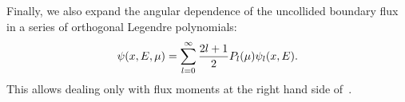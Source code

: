 Finally, we also expand the angular dependence of the uncollided boundary flux in a series of orthogonal Legendre polynomials:
\begin{equation}\label{eq:Q-series}
\psi(x,E,\mu) = \sum\limits_{l=0}^\infty {
	\frac{2l+1}{2} \ensuremath{P_l(\mu)} \psi_l(x,E)
}.
\end{equation}
This allows dealing only with flux moments at the right hand side of~.



